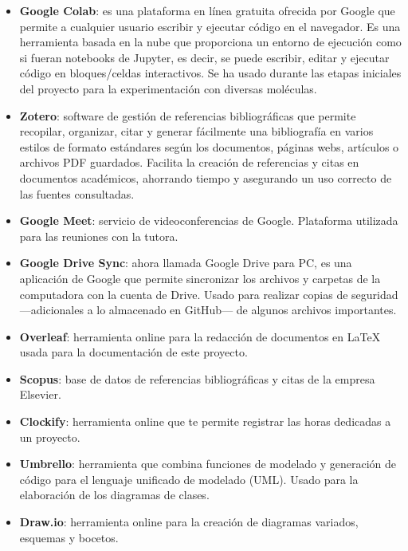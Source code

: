 \begin{itemize}
    \item \textbf{Google Colab}: es una plataforma en línea gratuita ofrecida por Google que permite a cualquier usuario escribir y ejecutar código en el navegador. Es una herramienta basada en la nube que proporciona un entorno de ejecución como si fueran notebooks de Jupyter, es decir, se puede escribir, editar y ejecutar código en bloques/celdas interactivos. Se ha usado durante las etapas iniciales del proyecto para la experimentación con diversas moléculas.
    
    \item \textbf{Zotero}: software de gestión de referencias bibliográficas que permite recopilar, organizar, citar y generar fácilmente una bibliografía en varios estilos de formato estándares según los documentos, páginas webs, artículos o archivos PDF guardados. Facilita la creación de referencias y citas en documentos académicos, ahorrando tiempo y asegurando un uso correcto de las fuentes consultadas.
    
    \item \textbf{Google Meet}: servicio de videoconferencias de Google. Plataforma utilizada para las reuniones con la tutora.

    \item \textbf{Google Drive Sync}: ahora llamada Google Drive para PC, es una aplicación de Google que permite sincronizar los archivos y carpetas de la computadora con la cuenta de Drive. Usado para realizar copias de seguridad —adicionales a lo almacenado en GitHub— de algunos archivos importantes. 

    \item \textbf{Overleaf}: herramienta online para la redacción de documentos en LaTeX usada para la documentación de este proyecto.

    \item \textbf{Scopus}: base de datos de referencias bibliográficas y citas de la empresa Elsevier.

    \item \textbf{Clockify}: herramienta online que te permite registrar las horas dedicadas a un proyecto.

    \item \textbf{Umbrello}: herramienta que combina funciones de modelado y generación de código para el lenguaje unificado de modelado (UML). Usado para la elaboración de los diagramas de clases.

    \item \textbf{Draw.io}: herramienta online para la creación de diagramas variados, esquemas y bocetos.


\end{itemize}
